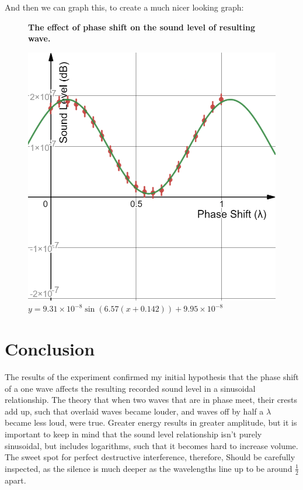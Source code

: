 \documentclass[index]{subfiles}
\begin{document}
And then we can graph this, to create a much nicer looking graph:

\begin{figure}[H]
    \centering
    \textbf{The effect of phase shift on the sound level of resulting wave.}\medskip\par
    \includegraphics[scale=0.3]{graph-calc.png}
    \caption{\(y=9.31\times 10^{-8}\sin\left(6.57\left(x+0.142\right)\right)+9.95\times 10^{-8}\) }
\end{figure}

\section{Conclusion}

The results of the experiment confirmed my initial hypothesis that the phase shift  of a one wave affects the resulting recorded sound level in a sinusoidal relationship. The theory that when two waves that are in phase meet, their crests add up, such that overlaid waves became louder, and waves off by half a \(\lambda\) became less loud, were true.
Greater energy results in greater amplitude, but it is important to keep in mind that the sound level relationship isn't purely sinusoidal, but includes logarithms, such that it becomes hard to increase volume. The sweet spot for perfect destructive interference, therefore, Should be carefully inspected, as the silence is much deeper as the wavelengths line up to be around \(\frac{1}{2}\) apart.
\end{document}
